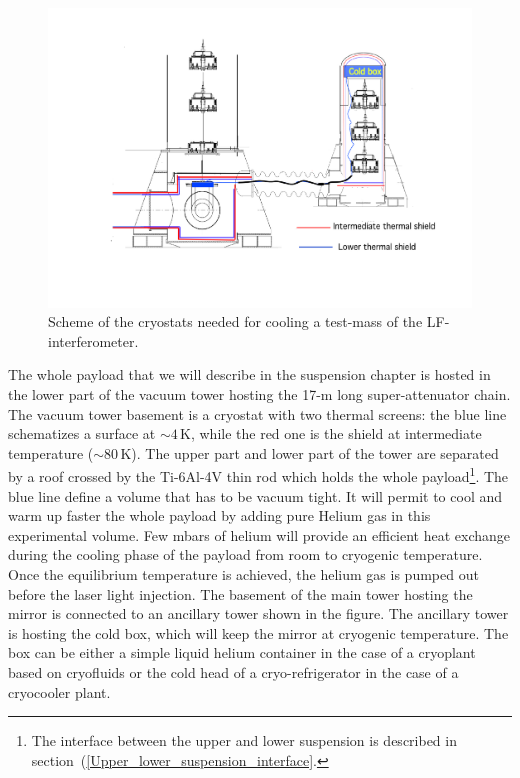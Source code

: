 \begin{figure}[t!]
	\begin{center}
		\includegraphics[width=17cm]{./Sec_SiteInfra/Figures/ET_main-cryostat.pdf}
		\caption{Scheme of the cryostats needed for cooling a test-mass of the LF-interferometer.}
		\label{fig:cryo_infrastructure_figure/ET_main-cryostat}
	\end{center}
\end{figure}


The whole payload that we will describe in the suspension chapter is hosted in the lower part of the vacuum tower hosting the 17-m long super-attenuator chain.  The vacuum tower basement is a cryostat  with two thermal screens: the blue line schematizes a surface at $\sim4$\,K, while the red one is the shield at intermediate temperature ($\sim 80$\,K). The upper part and lower part of the tower are separated by a roof  crossed by the Ti-6Al-4V thin rod    which holds the whole payload\footnote{The interface between the upper and lower suspension is described in section~(\ref{Upper_lower_suspension_interface}.}.
The blue line define a volume that has to be vacuum tight. It will permit to cool and warm up faster  the whole payload by  adding pure Helium gas in this experimental volume. Few  mbars of helium   will provide an efficient heat exchange during the cooling phase of the payload from room to cryogenic temperature. Once  the equilibrium temperature is achieved, the helium gas is pumped out before  the laser light injection. 
The basement of the main tower hosting the mirror is connected to an ancillary tower  shown in the figure.
The ancillary tower is  hosting the cold box, which will keep the mirror at cryogenic temperature. The box can be either a simple liquid helium container in the case of a cryoplant based on cryofluids or the cold head of a cryo-refrigerator in the case of a cryocooler plant.

